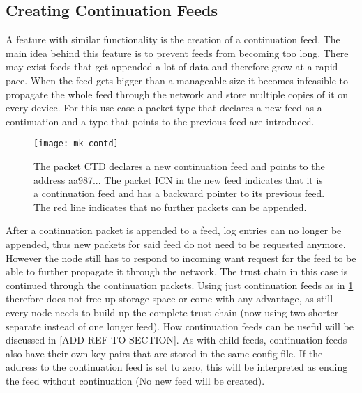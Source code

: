 \subsection{Creating Continuation Feeds}
A feature with similar functionality is the creation of a continuation feed. The main idea behind this feature is to prevent feeds from becoming too long. There may exist feeds that get appended a lot of data and therefore grow at a rapid pace. When the feed gets bigger than a manageable size it becomes infeasible to propagate the whole feed through the network and store multiple copies of it on every device. For this use-case a packet type that declares a new feed as a continuation and a type that points to the previous feed are introduced.

\begin{figure}
\centering
\texttt{[image: mk\_contd]}
\caption{The packet CTD declares a new continuation feed and points to the address aa987... The packet ICN in the new feed indicates that it is a continuation feed and has a backward pointer to its previous feed. The red line indicates that no further packets can be appended.}
\label{fig:mk_contd}
\end{figure}

After a continuation packet is appended to a feed, log entries can no longer be appended, thus new packets for said feed do not need to be requested anymore. However the node still has to respond to incoming want request for the feed to be able to further propagate it through the network. The trust chain in this case is continued through the continuation packets. Using just continuation feeds as in \cref{fig:mk_contd} therefore does not free up storage space or come with any advantage, as still every node needs to build up the complete trust chain (now using two shorter separate instead of one longer feed). How continuation feeds can be useful will be discussed in [ADD REF TO SECTION]. As with child feeds, continuation feeds also have their own key-pairs that are stored in the same config file. If the address to the continuation feed is set to zero, this will be interpreted as ending the feed without continuation (No new feed will be created).






